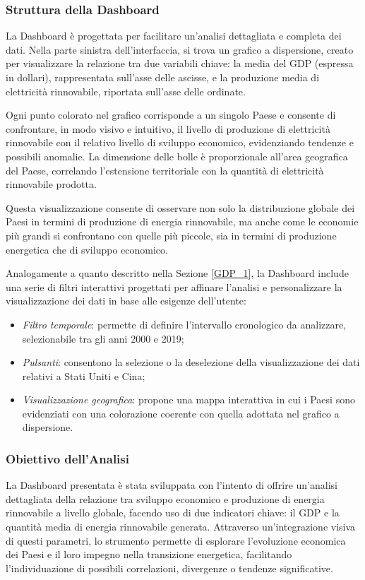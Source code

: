 \subsubsection{Struttura della Dashboard}
La Dashboard è progettata per facilitare un'analisi dettagliata e completa dei dati. Nella parte sinistra dell'interfaccia, si trova un grafico a dispersione, creato per visualizzare la relazione tra due variabili chiave: la media del GDP (espressa in dollari), rappresentata sull'asse delle ascisse, e la produzione media di elettricità rinnovabile, riportata sull'asse delle ordinate.

Ogni punto colorato nel grafico corrisponde a un singolo Paese e consente di confrontare, in modo visivo e intuitivo, il livello di produzione di elettricità rinnovabile con il relativo livello di sviluppo economico, evidenziando tendenze e possibili anomalie. La dimensione delle bolle è proporzionale all'area geografica del Paese, correlando l'estensione territoriale con la quantità di elettricità rinnovabile prodotta.

Questa visualizzazione consente di osservare non solo la distribuzione globale dei Paesi in termini di produzione di energia rinnovabile, ma anche come le economie più grandi si confrontano con quelle più piccole, sia in termini di produzione energetica che di sviluppo economico.

Analogamente a quanto descritto nella Sezione \ref{GDP_1}, la Dashboard include una serie di filtri interattivi progettati per affinare l'analisi e personalizzare la visualizzazione dei dati in base alle esigenze dell'utente:

\vspace{2mm} 
\begin{itemize} 
\item \textit{Filtro temporale}: permette di definire l'intervallo cronologico da analizzare, selezionabile tra gli anni 2000 e 2019; 
\item \textit{Pulsanti}: consentono la selezione o la deselezione della visualizzazione dei dati relativi a Stati Uniti e Cina; 
\item \textit{Visualizzazione geografica}: propone una mappa interattiva in cui i Paesi sono evidenziati con una colorazione coerente con quella adottata nel grafico a dispersione. 
\end{itemize} 
\vspace{2mm}

\subsubsection{Obiettivo dell'Analisi}
La Dashboard presentata è stata sviluppata con l'intento di offrire un'analisi dettagliata della relazione tra sviluppo economico e produzione di energia rinnovabile a livello globale, facendo uso di due indicatori chiave: il GDP e la quantità media di energia rinnovabile generata. Attraverso un'integrazione visiva di questi parametri, lo strumento permette di esplorare l'evoluzione economica dei Paesi e il loro impegno nella transizione energetica, facilitando l'individuazione di possibili correlazioni, divergenze o tendenze significative.

